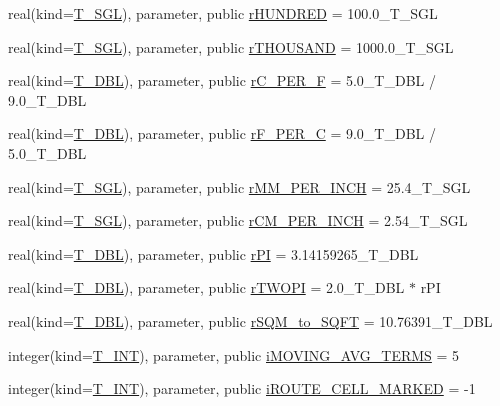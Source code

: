 \begin{DoxyCompactItemize}
\item 
real(kind=\hyperlink{namespacetest_a04d8b9090502de3a00046fe904bc3d99}{T\_\-SGL}), parameter, public \hyperlink{namespacetest_ae0e7b5cd24e302e72154de8cd84b911e}{rHUNDRED} = 100.0\_\-T\_\-SGL
\item 
real(kind=\hyperlink{namespacetest_a04d8b9090502de3a00046fe904bc3d99}{T\_\-SGL}), parameter, public \hyperlink{namespacetest_a09ee29fcb038648024d5f3021e2f8e05}{rTHOUSAND} = 1000.0\_\-T\_\-SGL
\item 
real(kind=\hyperlink{namespacetest_af379b935264d350d76bf75331181e241}{T\_\-DBL}), parameter, public \hyperlink{namespacetest_a95fd1d84e61f442438a5e81b15c00185}{rC\_\-PER\_\-F} = 5.0\_\-T\_\-DBL / 9.0\_\-T\_\-DBL
\item 
real(kind=\hyperlink{namespacetest_af379b935264d350d76bf75331181e241}{T\_\-DBL}), parameter, public \hyperlink{namespacetest_ac2670ae461db7392fc780c5fc733d06f}{rF\_\-PER\_\-C} = 9.0\_\-T\_\-DBL / 5.0\_\-T\_\-DBL
\item 
real(kind=\hyperlink{namespacetest_a04d8b9090502de3a00046fe904bc3d99}{T\_\-SGL}), parameter, public \hyperlink{namespacetest_a63234032fe45a56340c75291af043fd0}{rMM\_\-PER\_\-INCH} = 25.4\_\-T\_\-SGL
\item 
real(kind=\hyperlink{namespacetest_a04d8b9090502de3a00046fe904bc3d99}{T\_\-SGL}), parameter, public \hyperlink{namespacetest_a99c086ce41f7f593657b86272536caa1}{rCM\_\-PER\_\-INCH} = 2.54\_\-T\_\-SGL
\item 
real(kind=\hyperlink{namespacetest_af379b935264d350d76bf75331181e241}{T\_\-DBL}), parameter, public \hyperlink{namespacetest_a374cf972567d5d75483cb459084f3d4e}{rPI} = 3.14159265\_\-T\_\-DBL
\item 
real(kind=\hyperlink{namespacetest_af379b935264d350d76bf75331181e241}{T\_\-DBL}), parameter, public \hyperlink{namespacetest_a28a64e68af4df21c5a1c16a3dad0a400}{rTWOPI} = 2.0\_\-T\_\-DBL $\ast$ rPI
\item 
real(kind=\hyperlink{namespacetest_af379b935264d350d76bf75331181e241}{T\_\-DBL}), parameter, public \hyperlink{namespacetest_a3f71bffc4ddb3031cb85b1bbd0731823}{rSQM\_\-to\_\-SQFT} = 10.76391\_\-T\_\-DBL
\item 
integer(kind=\hyperlink{namespacetest_a6f91ebd89b58cfcc5da99faed9385c1e}{T\_\-INT}), parameter, public \hyperlink{namespacetest_a01d23f78fddde9b4d7918751ce961815}{iMOVING\_\-AVG\_\-TERMS} = 5
\item 
integer(kind=\hyperlink{namespacetest_a6f91ebd89b58cfcc5da99faed9385c1e}{T\_\-INT}), parameter, public \hyperlink{namespacetest_a0b4633c7ece605f3f9e541d1bb6068b1}{iROUTE\_\-CELL\_\-MARKED} = -\/1

\end{DoxyCompactItemize}
